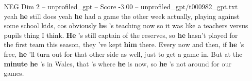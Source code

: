 \begin{textsample}{NEG Dim 2 – unprofiled\_gpt – Score -3.00 – unprofiled\_gpt/t000982\_gpt.txt}  \label{ex:f2_neg_025}
yeah \textbf{he} still does yeah \textbf{he} had a game the other week actually, playing against some school kids, cos obviously \textbf{he} ’s teaching now so it was like a teachers versus pupils thing I think. \textbf{He} ’s still captain of the reserves, so \textbf{he} hasn't played for the first team this season, they ’ve kept \textbf{him} there.
Every now and then, if \textbf{he} ’s free, \textbf{he} ’ll turn out for that other side as well, just to get a game in.
But at the \textbf{minute} \textbf{he} ’s in Wales, that ’s where \textbf{he} is now, so \textbf{he} ’s not around for our games.

\end{textsample}
